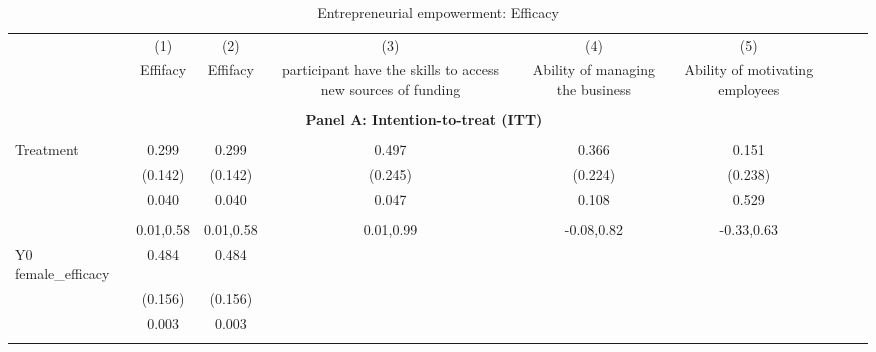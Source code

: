 \begin{table}[!h] \centering \\ \caption{Entrepreneurial empowerment: Efficacy} \\ \begin{adjustbox}{width=\columnwidth,center} \\ \begin{tabular}{l*{8}{c}} \hline\hline
                    &\multicolumn{1}{c}{(1)}         &\multicolumn{1}{c}{(2)}         &\multicolumn{1}{c}{(3)}         &\multicolumn{1}{c}{(4)}         &\multicolumn{1}{c}{(5)}         \\
                    &    Effifacy         &    Effifacy         &participant have the skills to access new sources of funding         &Ability of managing the business         &Ability of motivating employees         \\
\hline \\ \multicolumn{7}{c}{\textbf{Panel A: Intention-to-treat (ITT)}} \\\\[-1ex]
Treatment           &       0.299\sym{**} &       0.299\sym{**} &       0.497\sym{**} &       0.366         &       0.151         \\
                    &     (0.142)         &     (0.142)         &     (0.245)         &     (0.224)         &     (0.238)         \\
                    &       0.040         &       0.040         &       0.047         &       0.108         &       0.529         \\
                    &                     &                     &                     &                     &                     \\
                    &   0.01,0.58         &   0.01,0.58         &   0.01,0.99         &  -0.08,0.82         &  -0.33,0.63         \\
Y0 female\_efficacy  &       0.484\sym{***}&       0.484\sym{***}&                     &                     &                     \\
                    &     (0.156)         &     (0.156)         &                     &                     &                     \\
                    &       0.003         &       0.003         &                     &                     &                     \\
                    &                     &                     &                     &                     &                     \\

\end{tabular}
\end{adjustbox}
\end{table}
